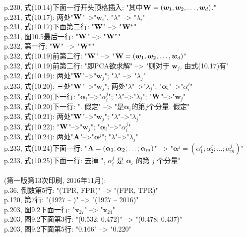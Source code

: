 \documentclass[UTF8]{article}
\begin{document}
p.230, 式(10.14)下面一行开头顶格插入: "其中${\bf W} = (\bm{w}_1, \bm{w}_2, \ldots, \bm{w}_d)$." \\
p.231, 式(10.17): 两处"${\bf W}$"-->"${\bm w}_i$", "$\lambda$" --> "$\lambda_i$" \\
p.231, 式(10.17)下面第二行: "${\bf W}$" --> "${\bf W}^*$" \\
p.231, 图10.5最后一行: "${\bf W}$" --> "${\bf W}^*$" \\
p.232, 第一行: "${\bf W}$" --> "${\bf W}^*$" \\
p.232, 式(10.19)前第二行: "${\bf W}$" --> "${\bf W} = (\bm{w}_1, \bm{w}_2, \ldots, \bm{w}_d)$" \\
p.232, 式(10.19)前第二行: "即PCA欲求解" --> "则对于 $\bm{w}_j$, 由式(10.17)有" \\
p.232, 式(10.19): 两处"${\bf W}$"-->"${\bm w}_j$"; "$\lambda$" --> "$\lambda_j$" \\
p.233, 式(10.20): 三处"${\bf W}$"-->"${\bm w}_j$"; 两处"$\lambda$"-->"$\lambda_j$"; "${\bm \alpha}_i$"-->"$\alpha_i^j$" \\
p.233, 式(10.20)下一行: "${\bm \alpha}_i$"-->"$\alpha_i^j$"; "$\lambda$"-->"$\lambda_j$"; "${\bf W}$"-->"${\bm w}_j$" \\
p.233, 式(10.20)下一行: ". 假定" --> "是${\bm \alpha}_i$的第$j$个分量. 假定" \\
p.233, 式(10.21): 两处"${\bf W}$"-->"${\bm w}_j$"; "$\lambda$"-->"$\lambda_j$" \\
p.233, 式(10.22): "${\bf W}$"-->"${\bm w}_j$"; "${\bm \alpha}_i$"-->"$\alpha_i^j$" \\
p.233, 式(10.24): 两处"${\bf A}$"-->"${\bm \alpha}^j$"; "$\lambda$"-->"$\lambda_j$" \\
p.233, 式(10.24)下面一行: "${\bf A} = ({\bm \alpha}_1; {\bm \alpha}_2; \ldots; {\bm \alpha}_m)$" --> "${\bm \alpha}^j = (\alpha_1^j; \alpha_2^j; \ldots; \alpha_m^j)$" \\
p.233, 式(10.25)下面一行: 去掉 ", $\alpha_i^j$ 是 ${\bm \alpha}_i$ 的第 $j$ 个分量" \\
\\
(第一版第13次印刷, 2016年11月):
\\
p.36, 倒数第5行: "(TPR, FPR)" --> "(FPR, TPR)" \\
p.120, 第7行: "(1927 -- )" --> "(1927 -- 2016)" \\
p.203, 图9.2下面一行: "$\bm{x}_{27}$" --> "$\bm{x}_{24}$" \\
p.203, 图9.2下面第3行: "(0.532; 0.472)" --> "(0.478; 0.437)" \\
p.203, 图9.2下面第5行: "0.166" --> "0.220" \\
\end{document}
